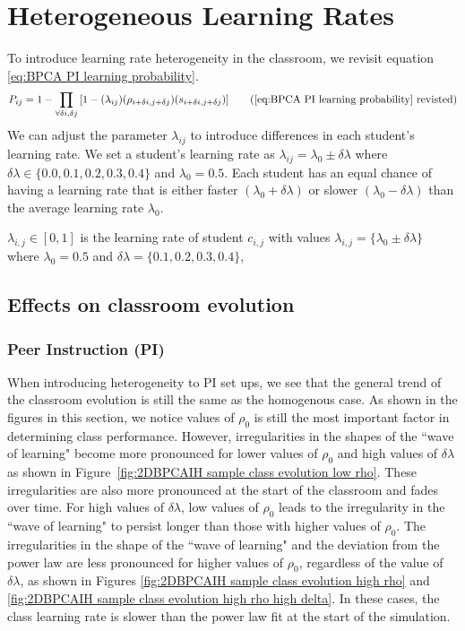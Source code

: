 \chapter{Heterogeneous Learning Rates}

To introduce learning rate heterogeneity in the classroom, we revisit equation \ref{eq:BPCA PI learning probability}. 
\begin{equation*}
    P_{ij} = 1 - \prod_{\forall \delta i, \delta j}{\lbrack1-(\lambda_{ij})(\rho_{i+\delta i, j+\delta j})(s_{i+\delta i, j+\delta j})}\rbrack
    \tag{\ref{eq:BPCA PI learning probability} revisted}
\end{equation*}
We can adjust the parameter $\lambda_{ij}$ to introduce differences in each student's learning rate. 
We set a student's learning rate as $\lambda_{ij} = \lambda_0 \pm \delta\lambda$ where $\delta\lambda \in \lbrace 0.0,0.1, 0.2, 0.3, 0.4\rbrace$ and $\lambda_0 = 0.5$. 
Each student has an equal chance of having a learning rate that is either faster $(\lambda_0 + \delta\lambda)$ or slower $(\lambda_0 - \delta\lambda)$ than the average learning rate $\lambda_0$. 

$\lambda_{i,j} \in [0,1]$ is the learning rate of student $c_{i,j}$ with values $\lambda_{i,j} = \lbrace \lambda_0 \pm \delta \lambda \rbrace$ where $\lambda_0 = 0.5$ and $\delta \lambda = \lbrace 0.1, 0.2, 0.3, 0.4 \rbrace$, 

\section{Effects on classroom evolution}\label{sec:BPCAIH effects on classroom evolution}
\subsection{Peer Instruction (PI)}\label{sec:BPCAIH effects on classroom evolution PI}
When introducing heterogeneity to PI set ups, we see that the general trend of the classroom evolution is still the same as the homogenous case.
As shown in the figures in this section, we notice values of $\rho_0$ is still the most important factor in determining class performance. 
However, irregularities in the shapes of the ``wave of learning" become more pronounced for lower values of $\rho_0$ and high values of $\delta\lambda$ as shown in Figure~\ref{fig:2DBPCAIH sample class evolution low rho}.
These irregularities are also more pronounced at the start of the classroom and fades over time.
For high values of $\delta\lambda$, low values of $\rho_0$ leads to the irregularity in the ``wave of learning" to persist longer than those with higher values of $\rho_0$.
The irregularities in the shape of the ``wave of learning" and the deviation from the power law are less pronounced for higher values of $\rho_0$, regardless of the value of $\delta\lambda$, as shown in Figures \ref{fig:2DBPCAIH sample class evolution high rho} and \ref{fig:2DBPCAIH sample class evolution high rho high delta}.
In these cases, the class learning rate is slower than the power law fit at the start of the simulation.

